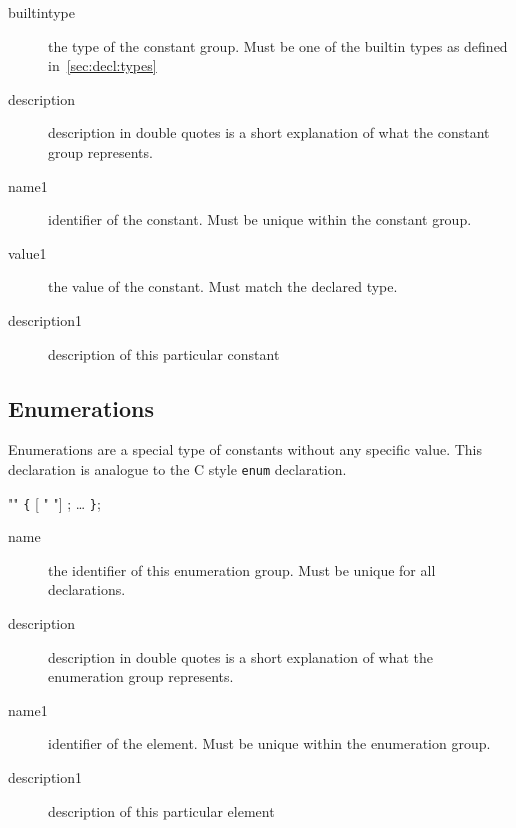 \documentclass[a4paper,11pt,twoside]{report}
\begin{document}
{{\begin{description}
    \item [builtintype] the type of the constant group. Must be one of the 
                        builtin types as defined in~\ref{sec:decl:types}
    
    \item [description] description in double quotes is a short explanation of
                        what the constant group represents.
    
    \item [name1] identifier of the constant. Must be unique within the 
                  constant group. 
    
    \item [value1] the value of the constant. Must match the declared type.
    
    \item [description1] description of this particular constant
    
\end{description}

\subsection{Enumerations}
\label{sec:decl:enums}

Enumerations are a special type of constants without any specific value. This
declaration is analogue to the C style \texttt{enum} declaration.

\begin{syntax}
  "" \verb+{+
     [ " "] ;
    \ldots
\verb+}+;
\end{syntax}

\begin{description}
    \item[name] the identifier of this enumeration group. Must be unique for 
                all declarations.
    
    \item [description] description in double quotes is a short explanation of
                        what the enumeration group represents.
    
    \item [name1] identifier of the element. Must be unique within the 
                  enumeration group.   
    
    \item [description1] description of this particular element
    

\end{description}}}
\end{document}
